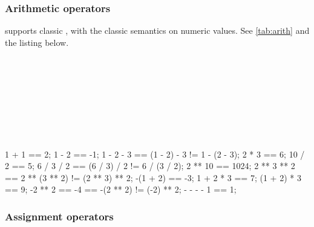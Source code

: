 \newenvironment{operatorTable}[3][]
{
  \def\operatorTableLabel{#2}%
  \def\operatorTableCaption{#3}%
  \begin{table}[\floatposh]
    \centering#1%
    \begin{operatorTabular}
    }{%
    \end{operatorTabular}
    \caption{\operatorTableCaption}
    \label{\operatorTableLabel}
  \end{table}
}

\subsubsection{Arithmetic operators}
\label{sec:lang:op:arith}



\us supports classic , with the classic semantics
on numeric values. See \autoref{tab:arith} and the listing below.
\begin{operatorTable}{tab:arith}{Arithmetic operators}
  \operatorexp
  \\\hline
  \operatoruplus\\\operatorumin
  \\\hline
  \operatormult\\\operatordiv\\\operatormod
  \\\hline
  \operatorplus\\\operatorminus
\end{operatorTable}

\begin{urbiassert}
       1 + 1 ==    2;
       1 - 2 ==   -1;  1 - 2 - 3 == (1 - 2) - 3 != 1 - (2 - 3);
       2 * 3 ==    6;
      10 / 2 ==    5;  6 / 3 / 2 == (6 / 3) / 2 != 6 / (3 / 2);
     2 ** 10 == 1024;  2 ** 3 ** 2 == 2 ** (3 ** 2) != (2 ** 3) ** 2;
    -(1 + 2) ==   -3;
   1 + 2 * 3 ==    7;
 (1 + 2) * 3 ==    9;
     -2 ** 2 ==   -4 == -(2 ** 2) != (-2) ** 2;
   - - - - 1 ==    1;
\end{urbiassert}

\subsubsection{Assignment operators}
\label{sec:lang:op:ass}



